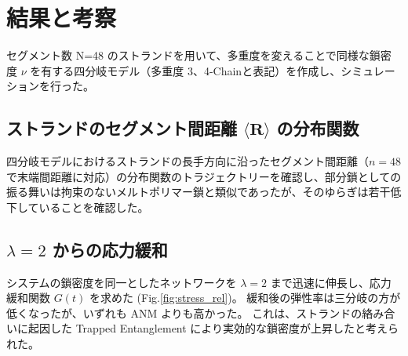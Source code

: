 \documentclass[uplatex,10pt,a4paper,twocolumn]{jsarticle}
\begin{document}


    \section{結果と考察}
    セグメント数 N=48 のストランドを用いて、多重度を変えることで同様な鎖密度 $\nu$ を有する四分岐モデル（多重度 3、4-Chainと表記）を作成し、シミュレーションを行った。
    
    \subsection{ストランドのセグメント間距離 $\langle \bm{R} \rangle$ の分布関数}
    
    四分岐モデルにおけるストランドの長手方向に沿ったセグメント間距離（$n=48$ で末端間距離に対応）の分布関数のトラジェクトリーを確認し、部分鎖としての振る舞いは拘束のないメルトポリマー鎖と類似であったが、そのゆらぎは若干低下していることを確認した。
    

    \subsection{$\lambda =2$ からの応力緩和}
    システムの鎖密度を同一としたネットワークを $\lambda =2$ まで迅速に伸長し、応力緩和関数 $G(t)$ を求めた (Fig.\ref{fig:stress_rel})。
    緩和後の弾性率は三分岐の方が低くなったが、いずれも ANM よりも高かった。
    これは、ストランドの絡み合いに起因した Trapped Entanglement により実効的な鎖密度が上昇したと考えられた。
\end{document}

